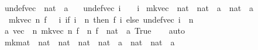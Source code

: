 \begin{isabellebody}
\isanewline
{}\isamarkupfalse%
\ undef{\isacharunderscore}{\kern0pt}vec\ {\isacharcolon}{\kern0pt}{\isacharcolon}{\kern0pt}\ {\isachardoublequoteopen}nat\ {\isasymRightarrow}\ {\isacharprime}{\kern0pt}a{\isachardoublequoteclose}\ \isanewline
\ \ {\isachardoublequoteopen}undef{\isacharunderscore}{\kern0pt}vec\ i\ {\isasymequiv}\ {\isacharbrackleft}{\kern0pt}{\isacharbrackright}{\kern0pt}\ {\isacharbang}{\kern0pt}\ i{\isachardoublequoteclose}\isanewline
\isanewline
{}\isamarkupfalse%
\ mk{\isacharunderscore}{\kern0pt}vec\ {\isacharcolon}{\kern0pt}{\isacharcolon}{\kern0pt}\ {\isachardoublequoteopen}nat\ {\isasymRightarrow}\ {\isacharparenleft}{\kern0pt}nat\ {\isasymRightarrow}\ {\isacharprime}{\kern0pt}a{\isacharparenright}{\kern0pt}\ {\isasymRightarrow}\ {\isacharparenleft}{\kern0pt}nat\ {\isasymRightarrow}\ {\isacharprime}{\kern0pt}a{\isacharparenright}{\kern0pt}{\isachardoublequoteclose}\ \isanewline
\ \ {\isachardoublequoteopen}mk{\isacharunderscore}{\kern0pt}vec\ n\ f\ {\isasymequiv}\ {\isasymlambda}\ i{\isachardot}{\kern0pt}\ if\ i\ {\isacharless}{\kern0pt}\ n\ then\ f\ i\ else\ undef{\isacharunderscore}{\kern0pt}vec\ {\isacharparenleft}{\kern0pt}i\ {\isacharminus}{\kern0pt}\ n{\isacharparenright}{\kern0pt}{\isachardoublequoteclose}\isanewline
\isanewline
{}\isamarkupfalse%
\ {\isacharprime}{\kern0pt}a\ vec\ {\isacharequal}{\kern0pt}\ {\isachardoublequoteopen}{\isacharbraceleft}{\kern0pt}{\isacharparenleft}{\kern0pt}n{\isacharcomma}{\kern0pt}\ mk{\isacharunderscore}{\kern0pt}vec\ n\ f{\isacharparenright}{\kern0pt}\ {\isacharbar}{\kern0pt}\ n\ f\ {\isacharcolon}{\kern0pt}{\isacharcolon}{\kern0pt}\ nat\ {\isasymRightarrow}\ {\isacharprime}{\kern0pt}a{\isachardot}{\kern0pt}\ True{\isacharbraceright}{\kern0pt}{\isachardoublequoteclose}\isanewline
%
\isadelimproof
\ \ %
\endisadelimproof
%
\isatagproof
{}\isamarkupfalse%
\ auto%
\endisatagproof
{\isafoldproof}%
%
\isadelimproof
\isanewline
%
\endisadelimproof
\isanewline
{}\isamarkupfalse%
\ mk{\isacharunderscore}{\kern0pt}mat\ {\isacharcolon}{\kern0pt}{\isacharcolon}{\kern0pt}\ {\isachardoublequoteopen}nat\ {\isasymRightarrow}\ nat\ {\isasymRightarrow}\ {\isacharparenleft}{\kern0pt}nat\ {\isasymtimes}\ nat\ {\isasymRightarrow}\ {\isacharprime}{\kern0pt}a{\isacharparenright}{\kern0pt}\ {\isasymRightarrow}\ {\isacharparenleft}{\kern0pt}nat\ {\isasymtimes}\ nat\ {\isasymRightarrow}\ {\isacharprime}{\kern0pt}a{\isacharparenright}{\kern0pt}{\isachardoublequoteclose}\ \isanewline

\end{isabellebody}
